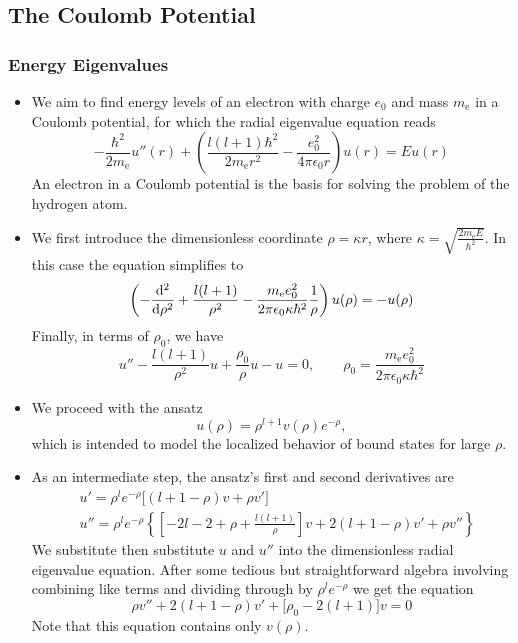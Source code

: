 \documentclass[11pt, a4paper]{article}
\begin{document}
\subsection{The Coulomb Potential}

\subsubsection{Energy Eigenvalues}
\begin{itemize}
	\item We aim to find energy levels of an electron with charge $ e_{0} $ and mass $ m_{\text{e}} $ in a Coulomb potential, for which the radial eigenvalue equation reads
	\begin{equation*}
		-\frac{\hbar^{2}}{2m_{\text{e}}}u''(r) + \left(\frac{l (l+1)\hbar^{2}}{2m_{\text{e}}r^{2}} - \frac{e_{0}^{2}}{4\pi \epsilon_{0}r}\right)u(r) = Eu(r)
	\end{equation*}
	An electron in a Coulomb potential is the basis for solving the problem of the hydrogen atom.
	
	\item We first introduce the dimensionless coordinate $ \rho = \kappa r $, where $ \kappa = \sqrt{\frac{2m_{\text{e}}E}{\hbar^{2}}} $. In this case the equation simplifies to 
	\begin{equation*}
		\left(-\dv[2]{}{\rho} + \frac{l (l+1)}{\rho^{2}} - \frac{m_{\text{e}}e_{0}^{2}}{2\pi \epsilon_{0} \kappa \hbar^{2}}\frac{1}{\rho}\right)u(\rho) = - u(\rho)
	\end{equation*}
	Finally, in terms of $ \rho_{0} $, we have
	\begin{equation*}
		u'' - \frac{l \left(l+1\right)}{\rho^{2}}u + \frac{\rho_{0}}{\rho}u - u = 0, \qquad \rho_{0} = \frac{m_{\text{e}}e_{0}^{2}}{2\pi \epsilon_{0}\kappa \hbar^{2}}
	\end{equation*}
	
	\item We proceed with the ansatz
	\begin{equation*}
		u(\rho) = \rho^{l + 1}v(\rho)e^{-\rho},
	\end{equation*}
	which is intended to model the localized behavior of bound states for large $ \rho $. 
	
	\item As an intermediate step, the ansatz's first and second derivatives are
	\begin{align*}
		& u' = \rho^{l}e^{-\rho} \big[(l+1-\rho)v + \rho v'\big]\\
		& u'' = \rho^{l}e^{-\rho}\left\{\left[-2l -2 + \rho + \frac{l (l+1)}{\rho}\right]v + 2(l + 1 - \rho)v' + \rho v''\right\}
	\end{align*}
	We substitute then substitute $ u $ and $ u'' $ into the dimensionless radial eigenvalue equation. After some tedious but straightforward algebra involving combining like terms and dividing through by $ \rho^{l}e^{-\rho} $ we get the equation
	\begin{equation*}
		\rho v'' + 2(l + 1 - \rho)v' + \big[\rho_{0} - 2(l+1)\big]v = 0
	\end{equation*}
	Note that this equation contains only $ v(\rho) $. 
	

\end{itemize}
\end{document}
